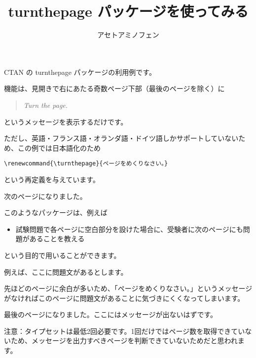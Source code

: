 \documentclass{jsarticle}
\title{\textsf{turnthepage} パッケージを使ってみる}
\author{アセトアミノフェン}
\renewcommand{\turnthepage}{ページをめくりなさい。}
\begin{document}
\maketitle

CTAN の \textsf{turnthepage} パッケージの利用例です。

機能は、見開きで右にあたる奇数ページ下部（最後のページを除く）に
\begin{quote}
\textit{Turn the page.}
\end{quote}
というメッセージを表示するだけです。

ただし、英語・フランス語・オランダ語・ドイツ語しかサポートしていないため、この例では日本語化のため
\begin{verbatim}
\renewcommand{\turnthepage}{ページをめくりなさい。}
\end{verbatim}
という再定義を与えています。

\clearpage

次のページになりました。

このようなパッケージは、例えば
\begin{itemize}
\item 試験問題で各ページに空白部分を設けた場合に、受験者に次のページにも問題があることを教える
\end{itemize}
という目的で用いることができます。

\clearpage

例えば、ここに問題文があるとします。

\clearpage

先ほどのページに余白が多いため、「ページをめくりなさい。」というメッセージがなければこのページに問題文があることに気づきにくくなってしまいます。

\clearpage

最後のページになりました。ここにはメッセージが出ないはずです。

注意：タイプセットは最低2回必要です。1回だけではページ数を取得できていないため、メッセージを出力すべきページを判断できていないためだと思われます。
\end{document}
